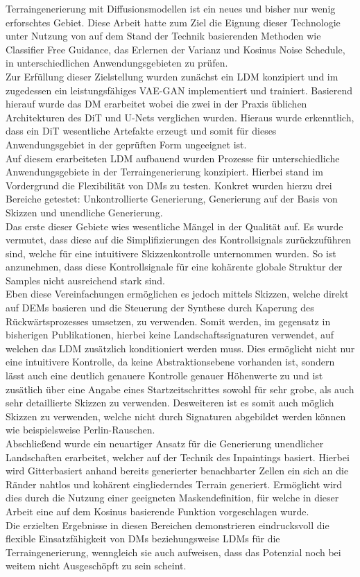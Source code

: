 Terraingenerierung mit Diffusionsmodellen ist ein neues und bisher nur wenig erforschtes Gebiet. Diese Arbeit hatte zum Ziel die Eignung dieser Technologie unter Nutzung von auf dem Stand der Technik basierenden Methoden wie Classifier Free Guidance, das Erlernen der Varianz und Kosinus Noise Schedule, in unterschiedlichen Anwendungsgebieten zu prüfen. \\
Zur Erfüllung dieser Zielstellung wurden zunächst ein LDM konzipiert und im zugedessen ein leistungsfähiges VAE-GAN implementiert und trainiert. Basierend hierauf wurde das DM erarbeitet wobei die zwei in der Praxis üblichen Architekturen des DiT und U-Nets verglichen wurden. Hieraus wurde erkenntlich, dass ein DiT wesentliche Artefakte erzeugt und somit für dieses Anwendungsgebiet in der geprüften Form ungeeignet ist. \\
Auf diesem erarbeiteten LDM aufbauend wurden Prozesse für unterschiedliche Anwendungsgebiete in der Terraingenerierung konzipiert. Hierbei stand im Vordergrund die Flexibilität von DMs zu testen. Konkret wurden hierzu drei Bereiche getestet: Unkontrollierte Generierung, Generierung auf der Basis von Skizzen und unendliche Generierung. \\
Das erste dieser Gebiete wies wesentliche Mängel in der Qualität auf. Es wurde vermutet, dass diese auf die Simplifizierungen des Kontrollsignals zurückzuführen sind, welche für eine intuitivere Skizzenkontrolle unternommen wurden. So ist anzunehmen, dass diese Kontrollsignale für eine kohärente globale Struktur der Samples nicht ausreichend stark sind. \\
Eben diese Vereinfachungen ermöglichen es jedoch mittels Skizzen, welche direkt auf DEMs basieren und die Steuerung der Synthese durch Kaperung des Rückwärtsprozesses umsetzen, zu verwenden. Somit werden, im gegensatz in bisherigen Publikationen, hierbei keine Landschaftssignaturen verwendet, auf welchen das LDM zusätzlich konditioniert werden muss. Dies ermöglicht nicht nur eine intuitivere Kontrolle, da keine Abstraktionsebene vorhanden ist, sondern lässt auch eine deutlich genauere Kontrolle genauer Höhenwerte zu und ist zusätlich über eine Angabe eines Startzeitschrittes sowohl für sehr grobe, als auch sehr detaillierte Skizzen zu verwenden. Desweiteren ist es somit auch möglich Skizzen zu verwenden, welche nicht durch Signaturen abgebildet werden können wie beispielsweise Perlin-Rauschen. \\
Abschließend wurde ein neuartiger Ansatz für die Generierung unendlicher Landschaften erarbeitet, welcher auf der Technik des Inpaintings basiert. Hierbei wird Gitterbasiert anhand bereits generierter benachbarter Zellen ein sich an die Ränder nahtlos und kohärent eingliederndes Terrain generiert. Ermöglicht wird dies durch die Nutzung einer geeigneten Maskendefinition, für welche in dieser Arbeit eine auf dem Kosinus basierende Funktion vorgeschlagen wurde. \\
Die erzielten Ergebnisse in diesen Bereichen demonstrieren eindrucksvoll die flexible Einsatzfähigkeit von DMs beziehungsweise LDMs für die Terraingenerierung, wenngleich sie auch aufweisen, dass das Potenzial noch bei weitem nicht Ausgeschöpft zu sein scheint.


